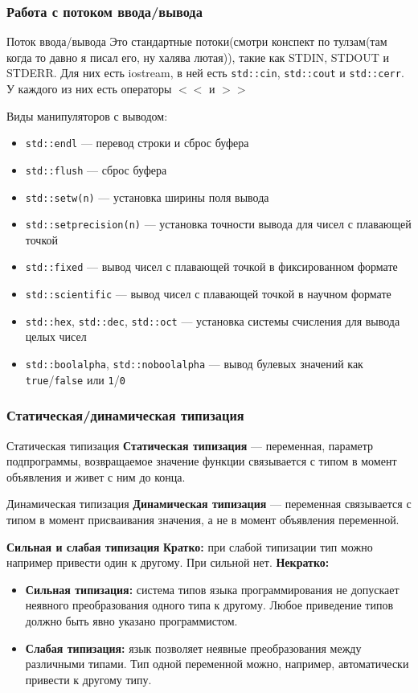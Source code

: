\subsubsection{Работа с потоком ввода/вывода}
\begin{definition}{Поток ввода/вывода}{}
  Это стандартные потоки(смотри конспект по тулзам(там когда то давно я писал его, ну халява лютая)), такие как STDIN, STDOUT и STDERR. Для них есть iostream, в ней есть \texttt{std::cin}, \texttt{std::cout} и \texttt{std::cerr}. У каждого из них есть операторы \texttt{$<<$} и \texttt{$>>$}
\end{definition}
Виды манипуляторов с выводом:
\begin{itemize}
  \item \texttt{std::endl} --- перевод строки и сброс буфера
  \item \texttt{std::flush} --- сброс буфера
  \item \texttt{std::setw(n)} --- установка ширины поля вывода
  \item \texttt{std::setprecision(n)} --- установка точности вывода для чисел с плавающей точкой
  \item \texttt{std::fixed} --- вывод чисел с плавающей точкой в фиксированном формате
  \item \texttt{std::scientific} --- вывод чисел с плавающей точкой в научном формате
  \item \texttt{std::hex}, \texttt{std::dec}, \texttt{std::oct} --- установка системы счисления для вывода целых чисел
  \item \texttt{std::boolalpha}, \texttt{std::noboolalpha} --- вывод булевых значений как \texttt{true}/\texttt{false} или \texttt{1}/\texttt{0}
\end{itemize}
\subsubsection{Статическая/динамическая типизация}
\begin{definition}{Статическая типизация}{}
\textbf{Статическая типизация} --- переменная, параметр подпрограммы, возвращаемое значение функции связывается с типом в момент объявления и живет с ним до конца.
\end{definition}
\begin{definition}{Динамическая типизация}{}
\textbf{Динамическая типизация} --- переменная связывается с типом в момент присваивания значения, а не в момент объявления переменной.
\end{definition}
\textbf{Сильная и слабая типизация}
\textbf{Кратко:} при слабой типизации тип можно например привести один к другому. При сильной нет.
\textbf{Некратко:}
\begin{itemize}
  \item \textbf{Сильная типизация:}
    система типов языка программирования не допускает неявного преобразования одного типа к другому.
    Любое приведение типов должно быть явно указано программистом.
  \item \textbf{Слабая типизация:}
    язык позволяет неявные преобразования между различными типами.
    Тип одной переменной можно, например, автоматически привести к другому типу.
\end{itemize}
